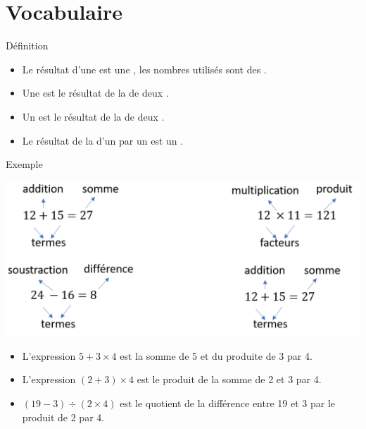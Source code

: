 \documentclass[xcolor={dvipsnames}]{beamer}
\begin{document}
\section{Vocabulaire}
\begin{frame}
	\begin{alertblock}{Définition}
		\begin{itemize}
			\item Le résultat d'une  est une \pause {}, les nombres utilisés sont \pause des .\pause
			
			\item Une  est le résultat de la \pause  {} de deux .\pause
			
			\item Un  est le résultat de la \pause {} de deux .\pause
			
			\item Le résultat de la  d'un \pause {} par un  est un .
		\end{itemize}
		
	\end{alertblock}

\end{frame}

\begin{frame}
	
	\begin{exampleblock}{Exemple}
		\begin{center}
			\includegraphics[scale=0.31]{op}
		\end{center}
	\end{exampleblock}
	
\end{frame}


%
\begin{frame}
	\begin{myexs}
		\begin{itemize}
			\item L'expression $5 + 3 \times 4$ est \pause la somme de 5 et du produite de 3 par 4.\pause
			
			\item L'expression $(2 + 3 ) \times 4$ est \pause le produit de la somme de 2 et 3 par 4.\pause
			
					
			\item $(19 - 3) \div (2 \times 4)$ est \pause le quotient de la différence entre  19 et 3 par le produit de 2 par 4.
		\end{itemize}
	\end{myexs}
\end{frame}
\end{document}
